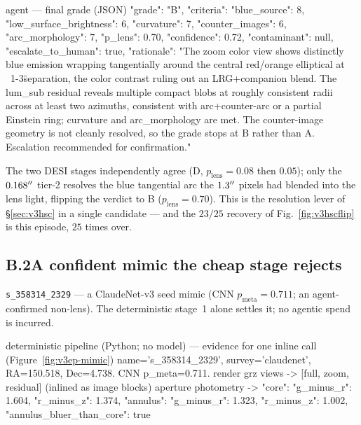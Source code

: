 \documentclass[11pt,letterpaper]{article}
\newcommand{\plens}{\ensuremath{p_{\mathrm{lens}}}}
\newcommand{\pmeta}{\ensuremath{p_{\mathrm{meta}}}}
\begin{document}
\begin{toolio}{agent --- final grade (JSON)}
{"grade": "B",
 "criteria": {"blue_source": 8, "low_surface_brightness": 6, "curvature": 7,
              "counter_images": 6, "arc_morphology": 7},
 "p_lens": 0.70, "confidence": 0.72, "contaminant": null, "escalate_to_human": true,
 "rationale": "The zoom color view shows distinctly blue emission wrapping tangentially around the
 central red/orange elliptical at ~1-3\" separation, the color contrast ruling out an LRG+companion
 blend. The lum_sub residual reveals multiple compact blobs at roughly consistent radii across at
 least two azimuths, consistent with arc+counter-arc or a partial Einstein ring; curvature and
 arc_morphology are met. The counter-image geometry is not cleanly resolved, so the grade stops at B
 rather than A. Escalation recommended for confirmation."}
\end{toolio}

\noindent The two DESI stages independently agree (D, $\plens=0.08$ then $0.05$); only the
$0.168^{\prime\prime}$ tier-2 resolves the blue tangential arc the $1.3^{\prime\prime}$ pixels had blended into the
lens light, flipping the verdict to B ($\plens=0.70$). This is the resolution lever of
\S\ref{sec:v3hsc} in a single candidate --- and the $23/25$ recovery of Fig.~\ref{fig:v3hscflip} is
this episode, $25$ times over.

\subsection*{B.2\quad A confident mimic the cheap stage rejects}
\texttt{s\_358314\_2329} --- a ClaudeNet-v3 seed mimic (CNN $\pmeta=0.711$; an agent-confirmed
non-lens). The deterministic stage~1 alone settles it; no agentic spend is incurred.

\begin{toolio}{deterministic pipeline (Python; no model) --- evidence for one inline call (Figure~\ref{fig:v3ep-mimic})}
name='s_358314_2329', survey='claudenet', RA=150.518, Dec=4.738.  CNN p_meta=0.711.
render grz views        -> [full, zoom, residual]   (inlined as image blocks)
aperture photometry     -> {"core":    {"g_minus_r": 1.604, "r_minus_z": 1.374},
                            "annulus": {"g_minus_r": 1.323, "r_minus_z": 1.002},
                            "annulus_bluer_than_core": true}
\end{toolio}
\end{document}
